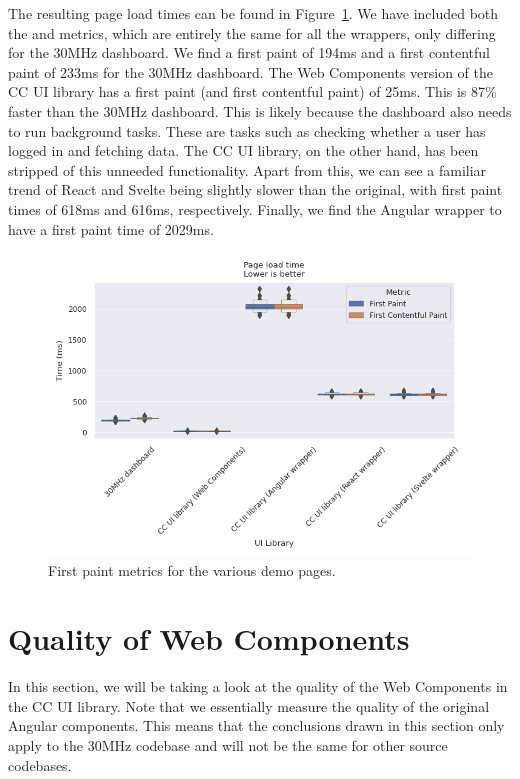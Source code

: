 The resulting page load times can be found in Figure~\ref{fig:results:first-paint}. We have included both the  and  metrics, which are entirely the same for all the wrappers, only differing for the 30MHz dashboard. We find a first paint of 194ms and a first contentful paint of 233ms for the 30MHz dashboard. The Web Components version of the CC UI library has a first paint (and first contentful paint) of 25ms. This is 87\% faster than the 30MHz dashboard. This is likely because the dashboard also needs to run background tasks. These are tasks such as checking whether a user has logged in and fetching data. The CC UI library, on the other hand, has been stripped of this unneeded functionality. Apart from this, we can see a familiar trend of React and Svelte being slightly slower than the original, with first paint times of 618ms and 616ms, respectively. Finally, we find the Angular wrapper to have a first paint time of 2029ms.

\begin{figure}[h]
  \includegraphics[width=\columnwidth]{plots/first-contentful-paint.png}
  \caption{First paint metrics for the various demo pages.}
  \label{fig:results:first-paint}
  \centering
\end{figure}

\section{Quality of Web Components}
In this section, we will be taking a look at the quality of the Web Components in the CC UI library. Note that we essentially measure the quality of the original Angular components. This means that the conclusions drawn in this section only apply to the 30MHz codebase and will not be the same for other source codebases.


